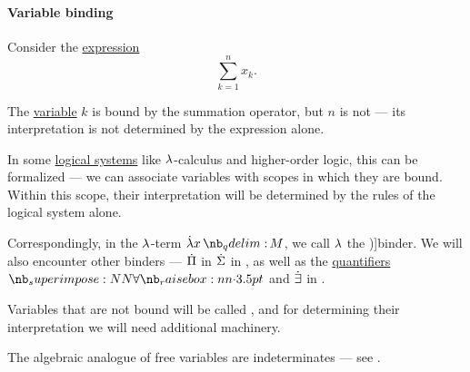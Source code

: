 \paragraph{Variable binding}

\begin{concept}\label{con:variable_binding}
  Consider the \hyperref[con:expression]{expression}
  \begin{equation*}
    \sum_{k=1}^n x_k.
  \end{equation*}

  The \hyperref[con:variable]{variable} \( k \) is bound by the summation operator, but \( n \) is not --- its interpretation is not determined by the expression alone.

  In some \hyperref[con:logical_system]{logical systems} like \( {\mathrm \lambda} \)-calculus and higher-order logic, this can be formalized --- we can associate variables with scopes in which they are bound. Within this scope, their interpretation will be determined by the rules of the logical system alone.

  Correspondingly, in the \( {\mathrm \lambda} \)-term \( \qabs x M \), we call \( {\mathrm \lambda} \) the \term[en=binder (\cite[23]{UnivalentFoundationsProgram2024OctoberHoTT})]{binder}. We will also encounter other binders --- \( \dot{\Pi} \) in \( \dot{\Sigma} \) in , as well as the \hyperref[con:quantifier]{quantifiers} \( \synforall \) and \( \dot{\exists} \) in .

  Variables that are not bound will be called , and for determining their interpretation we will need additional machinery.
\end{concept}
\begin{comments}
  \item The algebraic analogue of free variables are indeterminates --- see .
\end{comments}

